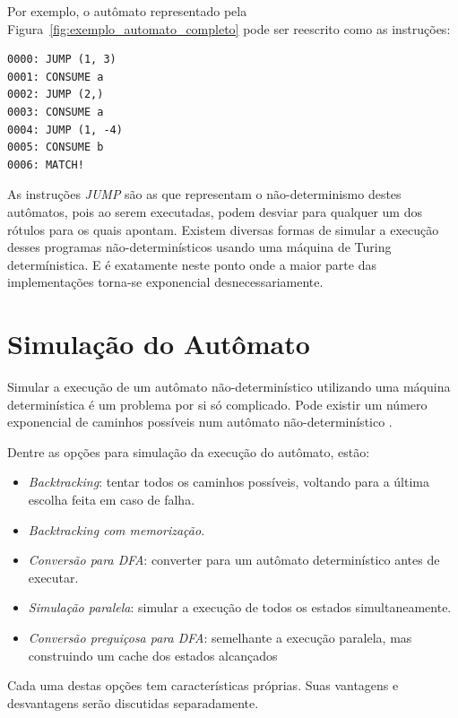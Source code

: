 \documentclass[a4paper,12pt,oneside,onecolumn]{uerj}
\begin{document}
Por exemplo, o autômato representado pela Figura~\ref{fig:exemplo_automato_completo} pode ser reescrito como as instruções:

\nopagebreak 
\begin{verbatim}
0000: JUMP (1, 3)
0001: CONSUME a
0002: JUMP (2,)
0003: CONSUME a
0004: JUMP (1, -4)
0005: CONSUME b
0006: MATCH!
\end{verbatim}

As instruções \emph{JUMP} são as que representam o não-determinismo destes autômatos, pois ao serem executadas, podem desviar para qualquer um dos rótulos para os quais apontam. Existem diversas formas de simular a execução desses programas não-determinísticos usando uma máquina de Turing determínistica. E é exatamente neste ponto onde a maior parte das implementações torna-se exponencial desnecessariamente.

\section{Simulação do Autômato}\label{sec:simulacao}

Simular a execução de um autômato não-determinístico utilizando uma máquina determinística é um problema por si só complicado. Pode existir um número exponencial de caminhos possíveis num autômato não-determinístico \cite{bib:Rabin59}.

Dentre as opções para simulação da execução do autômato, estão:

\begin{itemize}
    \item \emph{Backtracking}: tentar todos os caminhos possíveis, voltando para a última escolha feita em caso de falha.
    \item \emph{Backtracking com memorização}.
    \item \emph{Conversão para DFA}: converter para um autômato determinístico antes de executar.
    \item \emph{Simulação paralela}: simular a execução de todos os estados simultaneamente.
	\item \emph{Conversão preguiçosa para DFA}: semelhante a execução paralela, mas construindo um cache dos estados alcançados
\end{itemize}

Cada uma destas opções tem características próprias. Suas vantagens e desvantagens serão discutidas separadamente.
\end{document}
